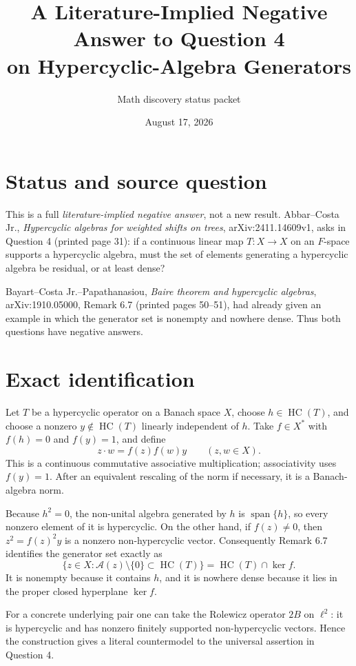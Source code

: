 \documentclass[11pt]{article}
\title{A Literature-Implied Negative Answer to Question 4\\
on Hypercyclic-Algebra Generators}
\author{Math discovery status packet}
\date{August 17, 2026}
\newcommand{\HC}{\operatorname{HC}}
\begin{document}
\maketitle

\section{Status and source question}

This is a full \emph{literature-implied negative answer}, not a new result.
Abbar--Costa Jr., \emph{Hypercyclic algebras for weighted shifts on trees},
arXiv:2411.14609v1, asks in Question 4 (printed page 31): if a continuous
linear map \(T:X\to X\) on an \(F\)-space supports a hypercyclic algebra, must
the set of elements generating a hypercyclic algebra be residual, or at least
dense?

Bayart--Costa Jr.--Papathanasiou, \emph{Baire theorem and hypercyclic
algebras}, arXiv:1910.05000, Remark 6.7 (printed pages 50--51), had already
given an example in which the generator set is nonempty and nowhere dense.
Thus both questions have negative answers.

\section{Exact identification}

Let \(T\) be a hypercyclic operator on a Banach space \(X\), choose
\(h\in\HC(T)\), and choose a nonzero \(y\notin\HC(T)\) linearly independent
of \(h\).  Take \(f\in X^*\) with
\(f(h)=0\) and \(f(y)=1\), and define
\[
        z\cdot w=f(z)f(w)y \qquad(z,w\in X).
\]
This is a continuous commutative associative multiplication; associativity
uses \(f(y)=1\).  After an equivalent rescaling of the norm if necessary, it
is a Banach-algebra norm.

Because \(h^2=0\), the non-unital algebra generated by \(h\) is
\(\operatorname{span}\{h\}\), so every nonzero element of it is hypercyclic.
On the other hand, if \(f(z)\ne0\), then
\(z^2=f(z)^2y\) is a nonzero non-hypercyclic vector.  Consequently Remark 6.7
identifies the generator set exactly as
\[
 \bigl\{z\in X:\mathcal A(z)\setminus\{0\}\subset\HC(T)\bigr\}
       =\HC(T)\cap\ker f.
\]
It is nonempty because it contains \(h\), and it is nowhere dense because it
lies in the proper closed hyperplane \(\ker f\).

For a concrete underlying pair one can take the Rolewicz operator \(2B\) on
\(\ell^2\): it is hypercyclic and has nonzero finitely supported
non-hypercyclic vectors.  Hence the construction gives a literal countermodel
to the universal assertion in Question 4.
\end{document}
